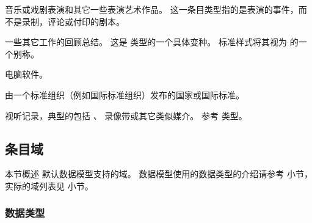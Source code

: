 \begin{typelist}
音乐或戏剧表演和其它一些表演艺术作品。
这一条目类型指的是表演的事件，而不是录制，评论或付印的剧本。

一些其它工作的回顾总结。
这是  类型的一个具体变种。
标准样式将其视为  的一个别称。

电脑软件。

由一个标准组织（例如国际标准组织）发布的国家或国际标准。

视听记录，典型的包括 、 录像带或其它类似媒介。
参考  类型。

\end{typelist}

\subsection{条目域}%
\label{bib:fld}


本节概述 \biblatex 默认数据模型支持的域。
数据模型使用的数据类型的介绍请参考 小节，
实际的域列表见 小节。

\subsubsection{数据类型}%
\label{bib:fld:typ}

